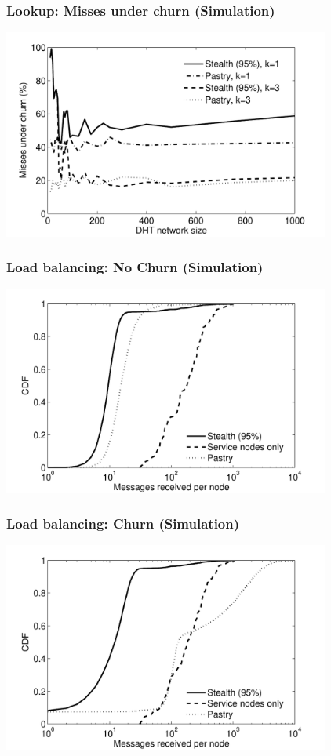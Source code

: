 \documentclass[xcolor=pdftex,dvipsnames,table]{beamer}
\begin{document}
\begin{frame}
    \frametitle{Lookup: Misses under churn (Simulation)}
    \includegraphics[width=10.75cm]{diagrams/Fig7}
\end{frame}


\begin{frame}
    \frametitle{Load balancing: No Churn (Simulation)}
    \includegraphics[width=10.75cm]{diagrams/Fig8a}
\end{frame}

\begin{frame}
    \frametitle{Load balancing: Churn (Simulation)}
    \includegraphics[width=10.75cm]{diagrams/Fig8b}
\end{frame}
\end{document}
